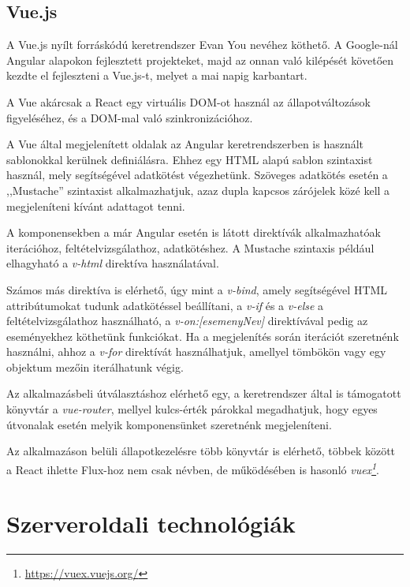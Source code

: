 \documentclass[
]{thesis-ekf}
\theoremstyle{definition}
\theoremstyle{remark}
\begin{document}
	
	
	\subsection[Vue.js]{Vue.js\cite{vuecomparison}\cite{vuedocs}}
	A Vue.js nyílt forráskódú keretrendszer Evan You nevéhez köthető. A Google-nál Angular alapokon fejlesztett projekteket, majd az onnan való kilépését követően kezdte el fejleszteni a Vue.js-t, melyet a mai napig karbantart.
	
	A Vue akárcsak a React egy virtuális DOM-ot használ az állapotváltozások figyeléséhez, és a DOM-mal való szinkronizációhoz.
	
	A Vue által megjelenített oldalak az Angular keretrendszerben is használt sablonokkal kerülnek definiálásra. Ehhez egy HTML alapú sablon szintaxist használ, mely segítségével adatkötést végezhetünk. Szöveges adatkötés esetén a ,,Mustache'' szintaxist alkalmazhatjuk, azaz dupla kapcsos zárójelek közé kell a megjeleníteni kívánt adattagot tenni.
	
	A komponensekben a már Angular esetén is látott direktívák alkalmazhatóak iterációhoz, feltételvizsgálathoz, adatkötéshez. A Mustache szintaxis például elhagyható a \emph{v-html} direktíva használatával.
	
	
	
	Számos más direktíva is elérhető, úgy mint a \emph{v-bind}, amely segítségével HTML attribútumokat tudunk adatkötéssel beállítani, a \emph{v-if} és a \emph{v-else} a feltételvizsgálathoz használható, a \emph{v-on:[esemenyNev]} direktívával pedig az eseményekhez köthetünk funkciókat. Ha a megjelenítés során iterációt szeretnénk használni, ahhoz a \emph{v-for} direktívát használhatjuk, amellyel tömbökön vagy egy objektum mezőin iterálhatunk végig.
	
	Az alkalmazásbeli útválasztáshoz elérhető egy, a keretrendszer által is támogatott könyvtár a \emph{vue-router}, mellyel kulcs-érték párokkal megadhatjuk, hogy egyes útvonalak esetén melyik komponensünket szeretnénk megjeleníteni.
	
	Az alkalmazáson belüli állapotkezelésre több könyvtár is elérhető, többek között a React ihlette Flux-hoz nem csak névben, de működésében is hasonló \emph{vuex\footnote{\url{https://vuex.vuejs.org/}}}.
	
	\section{Szerveroldali technológiák}
\end{document}
